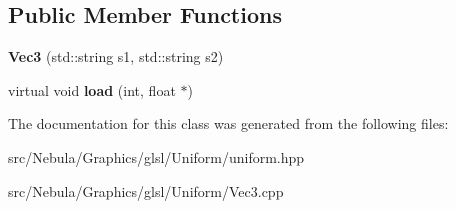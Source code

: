 \subsection*{\-Public \-Member \-Functions}
\begin{DoxyCompactItemize}
\item 
\hypertarget{classNeb_1_1glsl_1_1Uniform_1_1Vector_1_1Vec3_a1248082071bae8dbd4d346185c9b7185}{{\bfseries \-Vec3} (std\-::string s1, std\-::string s2)}\label{classNeb_1_1glsl_1_1Uniform_1_1Vector_1_1Vec3_a1248082071bae8dbd4d346185c9b7185}

\item 
\hypertarget{classNeb_1_1glsl_1_1Uniform_1_1Vector_1_1Vec3_a8ff99402b1b976def5bcacc4e012e5c1}{virtual void {\bfseries load} (int, float $\ast$)}\label{classNeb_1_1glsl_1_1Uniform_1_1Vector_1_1Vec3_a8ff99402b1b976def5bcacc4e012e5c1}

\end{DoxyCompactItemize}


\-The documentation for this class was generated from the following files\-:\begin{DoxyCompactItemize}
\item 
src/\-Nebula/\-Graphics/glsl/\-Uniform/uniform.\-hpp\item 
src/\-Nebula/\-Graphics/glsl/\-Uniform/\-Vec3.\-cpp\end{DoxyCompactItemize}
